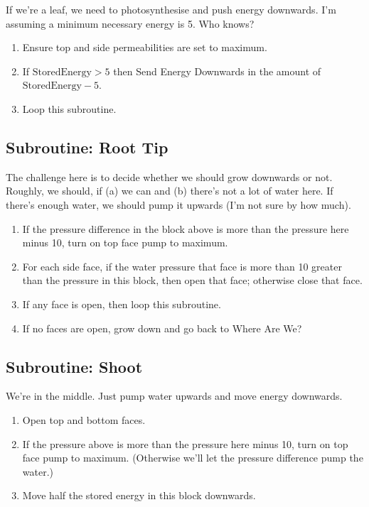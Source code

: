 \documentclass[10pt, a4paper, twocolumn]{article}
\begin{document}
If we're a leaf, we need to photosynthesise and push energy
downwards. I'm assuming a minimum necessary energy is 5. Who knows? 
\begin{enumerate}
\item Ensure top and side permeabilities are set to maximum.
\item If $\text{StoredEnergy} > 5$ then Send Energy Downwards in the
  amount of $\text{StoredEnergy} - 5$. 
\item Loop this subroutine.
\end{enumerate}

\subsection{Subroutine: Root Tip}

The challenge here is to decide whether we should grow downwards or
not. Roughly, we should, if (a) we can and (b) there's not a lot of
water here. If there's enough water, we should pump it upwards (I'm
not sure by how much).

\begin{enumerate}
\item If the pressure difference in the block above is more than the
  pressure here minus 10, turn on top face pump to maximum.
\item For each side face, if the water pressure that face is more than
  10 greater than the pressure in this block, then open that face;
  otherwise close that face. 
\item If any face is open, then loop this subroutine.
\item If no faces are open, grow down and go back to Where Are We?
\end{enumerate}

\subsection{Subroutine: Shoot}

We're in the middle. Just pump water upwards and move energy downwards. 

\begin{enumerate}
\item Open top and bottom faces.
\item If the pressure above is more than the pressure here minus 10,
  turn on top face pump to maximum. (Otherwise we'll let the pressure
  difference pump the water.)
\item Move half the stored energy in this block downwards.
\end{enumerate}
\end{document}
